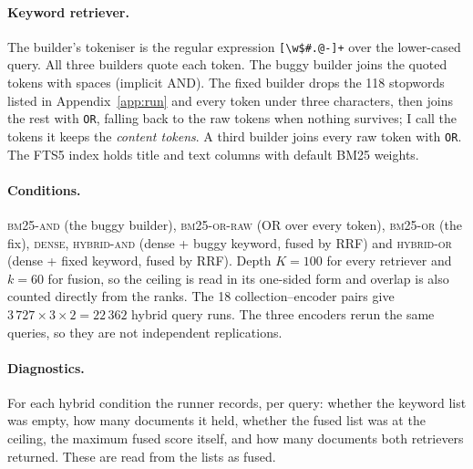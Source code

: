 \documentclass[11pt]{article}
\begin{document}
{\sloppy
\paragraph{Keyword retriever.} The builder's tokeniser is the regular expression \verb|[\w$#.@-]+| over the lower-cased query. All three builders quote each token. The buggy builder joins the quoted tokens with spaces (implicit AND). The fixed builder drops the 118 stopwords listed in Appendix~\ref{app:run} and every token under three characters, then joins the rest with \verb|OR|, falling back to the raw tokens when nothing survives; I call the tokens it keeps the \emph{content tokens}. A third builder joins every raw token with \verb|OR|. The FTS5 index holds title and text columns with default BM25 weights.\par}

{\sloppy
\paragraph{Conditions.} \textsc{bm25-and} (the buggy builder), \textsc{bm25-or-raw} (OR over every token), \textsc{bm25-or} (the fix), \textsc{dense}, \textsc{hybrid-and} (dense + buggy keyword, fused by RRF) and \textsc{hybrid-or} (dense + fixed keyword, fused by RRF). Depth $K = 100$ for every retriever and $k = 60$ for fusion, so the ceiling is read in its one-sided form and overlap is also counted directly from the ranks. The 18 collection--encoder pairs give $3\,727 \times 3 \times 2 = 22\,362$ hybrid query runs. The three encoders rerun the same queries, so they are not independent replications.\par}

\paragraph{Diagnostics.} For each hybrid condition the runner records, per query: whether the keyword list was empty, how many documents it held, whether the fused list was at the ceiling, the maximum fused score itself, and how many documents both retrievers returned. These are read from the lists as fused.
\end{document}
